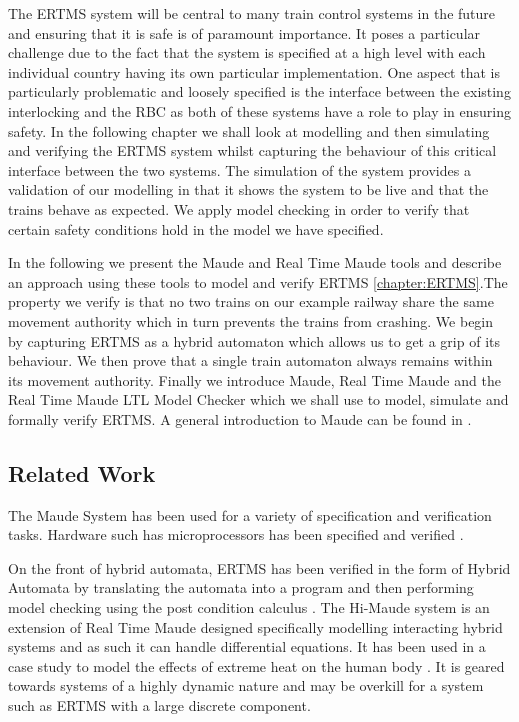 \newcommand{\rtmaude}{Real Time Maude}

The ERTMS system will be central to many train control systems in the future and ensuring that it is safe is of paramount importance. It poses a particular challenge due to the fact that the system is specified at a high level with each individual country having its own particular implementation. One aspect that is particularly problematic and loosely specified is the interface between the existing interlocking and the RBC as both of these systems have a role to play in ensuring safety. In the following chapter we shall look at modelling and then simulating and verifying the ERTMS system whilst capturing the behaviour of this critical interface between the two systems. The simulation of the system provides a validation of our modelling in that it shows the system to be live and that the trains behave as expected. We apply model checking in order to verify that certain safety conditions hold in the model we have specified.

In the following we present the Maude \cite{MC03,Maude} and Real Time Maude \cite{PO02,PO04,RTMaude} tools and describe an approach using these tools to model and verify ERTMS \ref{chapter:ERTMS}.The property we verify is that no two trains on our example railway share the same movement authority which in turn prevents the trains from crashing. We begin by capturing ERTMS as a hybrid automaton which allows us to get a grip of its behaviour. We then prove that a single train automaton always remains within its movement authority. Finally we introduce Maude, Real Time Maude and the Real Time Maude LTL Model Checker which we shall use to model, simulate and formally verify ERTMS. A general introduction to Maude can be found in \cite{MaudeBook}.



\subsection*{Related Work}
The Maude System has been used for a variety of specification and verification tasks. Hardware such has microprocessors has been specified and verified \cite{NH00}. 

On the front of hybrid automata, ERTMS has been verified in the form of Hybrid Automata by translating the automata into a program and then performing model checking using the post condition calculus \cite{DI13}. The Hi-Maude system \cite{MF11} is an extension of Real Time Maude designed specifically modelling interacting hybrid systems and as such it can handle differential equations. It has been used in a case study to model the effects of extreme heat on the human body \cite{MF12}. It is geared towards systems of a highly dynamic nature and may be overkill for a system such as ERTMS with a large discrete component.

